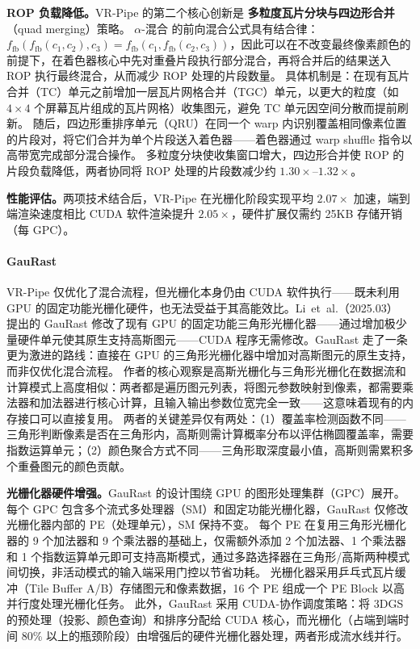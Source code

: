 \textbf{ROP 负载降低。}VR-Pipe 的第二个核心创新是 \textbf{多粒度瓦片分块与四边形合并}（quad merging）策略。
$\alpha$-混合 的前向混合公式具有结合律：$f_{\text{fb}}(f_{\text{fb}}(c_1, c_2), c_3) = f_{\text{fb}}(c_1, f_{\text{fb}}(c_2, c_3))$，因此可以在不改变最终像素颜色的前提下，在着色器核心中先对重叠片段执行部分混合，再将合并后的结果送入 ROP 执行最终混合，从而减少 ROP 处理的片段数量。
具体机制是：在现有瓦片合并（TC）单元之前增加一层瓦片网格合并（TGC）单元，以更大的粒度（如 $4\times4$ 个屏幕瓦片组成的瓦片网格）收集图元，避免 TC 单元因空间分散而提前刷新。
随后，四边形重排序单元（QRU）在同一个 warp 内识别覆盖相同像素位置的片段对，将它们合并为单个片段送入着色器——着色器通过 warp shuffle 指令以高带宽完成部分混合操作。
多粒度分块使收集窗口增大，四边形合并使 ROP 的片段负载降低，两者协同将 ROP 处理的片段数减少约 $1.30\times$--$1.32\times$。

\textbf{性能评估。}两项技术结合后，VR-Pipe 在光栅化阶段实现平均 $2.07\times$ 加速，端到端渲染速度相比 CUDA 软件渲染提升 $2.05\times$，硬件扩展仅需约 25KB 存储开销（每 GPC）。

\paragraph{GauRast}
VR-Pipe 仅优化了混合流程，但光栅化本身仍由 CUDA 软件执行——既未利用 GPU 的固定功能光栅化硬件，也无法受益于其高能效比。Li~et~al.（2025.03）~\cite{2503_16681} 提出的 GauRast 修改了现有 GPU 的固定功能三角形光栅化器——通过增加极少量硬件单元使其原生支持高斯图元——CUDA 程序无需修改。GauRast 走了一条更为激进的路线：直接在 GPU 的三角形光栅化器中增加对高斯图元的原生支持，而非仅优化混合流程。
作者的核心观察是高斯光栅化与三角形光栅化在数据流和计算模式上高度相似：两者都是遍历图元列表，将图元参数映射到像素，都需要乘法器和加法器进行核心计算，且输入输出参数位宽完全一致——这意味着现有的内存接口可以直接复用。
两者的关键差异仅有两处：（1）覆盖率检测函数不同——三角形判断像素是否在三角形内，高斯则需计算概率分布以评估椭圆覆盖率，需要指数运算单元；（2）颜色聚合方式不同——三角形取深度最小值，高斯则需累积多个重叠图元的颜色贡献。

\textbf{光栅化器硬件增强。}GauRast 的设计围绕 GPU 的图形处理集群（GPC）展开。
每个 GPC 包含多个流式多处理器（SM）和固定功能光栅化器，GauRast 仅修改光栅化器内部的 PE（处理单元），SM 保持不变。
每个 PE 在复用三角形光栅化器的 9 个加法器和 9 个乘法器的基础上，仅需额外添加 2 个加法器、1 个乘法器和 1 个指数运算单元即可支持高斯模式，通过多路选择器在三角形/高斯两种模式间切换，非活动模式的输入端采用门控以节省功耗。
光栅化器采用乒乓式瓦片缓冲（Tile Buffer A/B）存储图元和像素数据，16 个 PE 组成一个 PE Block 以高并行度处理光栅化任务。
此外，GauRast 采用 CUDA-协作调度策略：将 3DGS 的预处理（投影、颜色查询）和排序分配给 CUDA 核心，而光栅化（占端到端时间 80\% 以上的瓶颈阶段）由增强后的硬件光栅化器处理，两者形成流水线并行。

